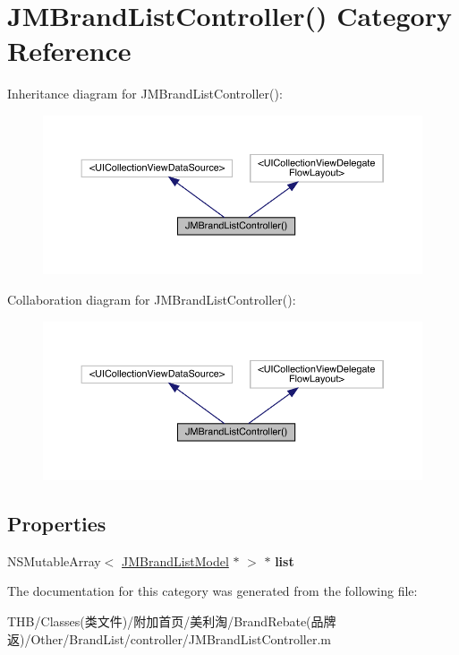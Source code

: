 \hypertarget{category_j_m_brand_list_controller_07_08}{}\section{J\+M\+Brand\+List\+Controller() Category Reference}
\label{category_j_m_brand_list_controller_07_08}


Inheritance diagram for J\+M\+Brand\+List\+Controller()\+:\nopagebreak
\begin{figure}[H]
\begin{center}
\leavevmode
\includegraphics[width=350pt]{category_j_m_brand_list_controller_07_08__inherit__graph}
\end{center}
\end{figure}


Collaboration diagram for J\+M\+Brand\+List\+Controller()\+:\nopagebreak
\begin{figure}[H]
\begin{center}
\leavevmode
\includegraphics[width=350pt]{category_j_m_brand_list_controller_07_08__coll__graph}
\end{center}
\end{figure}
\subsection*{Properties}
\begin{DoxyCompactItemize}
\item 
\mbox{\label{category_j_m_brand_list_controller_07_08_a9f1b1c798fa9f183c82a89643f9953ab}} 
N\+S\+Mutable\+Array$<$ \mbox{\hyperlink{interface_j_m_brand_list_model}{J\+M\+Brand\+List\+Model}} $\ast$ $>$ $\ast$ {\bfseries list}
\end{DoxyCompactItemize}


The documentation for this category was generated from the following file\+:\begin{DoxyCompactItemize}
\item 
T\+H\+B/\+Classes(类文件)/附加首页/美利淘/\+Brand\+Rebate(品牌返)/\+Other/\+Brand\+List/controller/J\+M\+Brand\+List\+Controller.\+m\end{DoxyCompactItemize}
